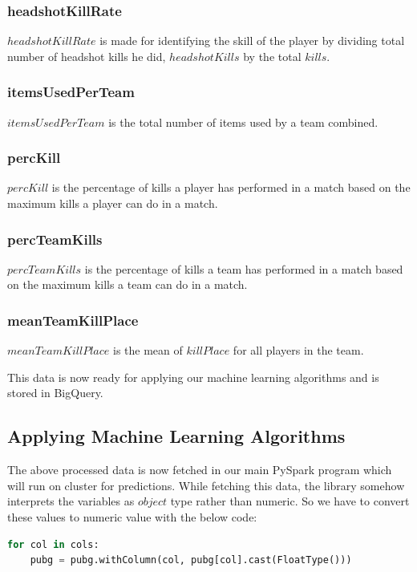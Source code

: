 \documentclass[journal,twoside,web]{ieeecolor}
\begin{document}
\subsubsection{headshotKillRate}
$headshotKillRate$ is made for identifying the skill of the player by dividing total number of headshot kills he did, $headshotKills$ by the total $kills$.

\subsubsection{itemsUsedPerTeam}
$itemsUsedPerTeam$ is the total number of items used by a team combined.

\subsubsection{percKill}
$percKill$ is the percentage of kills a player has performed in a match based on the maximum kills a player can do in a match.

\subsubsection{percTeamKills}
$percTeamKills$ is the percentage of kills a team has performed in a match based on the maximum kills a team can do in a match.

\subsubsection{meanTeamKillPlace}
$meanTeamKillPlace$ is the mean of $killPlace$ for all players in the team.

This data is now ready for applying our machine learning algorithms and is stored in BigQuery.

\subsection{Applying Machine Learning Algorithms}
The above processed data is now fetched in our main PySpark program which will run on cluster for predictions. While fetching this data, the library somehow interprets the variables as $object$ type rather than numeric. So we have to convert these values to numeric value with the below code:

\begin{lstlisting}[language=Python]
for col in cols:
    pubg = pubg.withColumn(col, pubg[col].cast(FloatType()))
\end{lstlisting}
\end{document}
